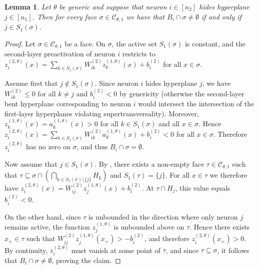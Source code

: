 \documentclass{article}
\newtheorem{lemma}[theorem]{Lemma}
\theoremstyle{definition}
\newcommand{\weights}[1]{W^{(#1)}}
\newcommand{\bias}[1]{b^{(#1)}}
\newcommand{\complex}{\mathcal{C}}
\newcommand{\activation}[1]{a^{(#1)}}
\newcommand{\preactivation}[1]{z^{(#1)}}
\begin{document}
\begin{lemma}
\label{lem:hidinghides}
Let $\theta$ be generic and suppose that neuron $i\in[n_2]$ hides hyperplane $j\in[n_1]$. 
Then for every face $\sigma\in\complex_{\theta,1}$ we have that
$
B_i\cap \sigma\neq\emptyset
$ if and only if $
j\in S_1(\sigma).
$
\end{lemma}

\begin{proof}
Let $\sigma\in\complex_{\theta,1}$ be a face. On $\sigma$, the active set $S_1(\sigma)$ is constant, and the second-layer preactivation of neuron $i$ restricts to
$
\preactivation{2,\theta}_i(x)
=
\sum_{k\in S_1(\sigma)} \weights{2}_{ik}\preactivation{1,\theta}_k(x)+\bias{2}_i
$
for all $x\in \sigma$.

Assume first that $j\notin S_1(\sigma)$. Since neuron $i$ hides hyperplane $j$, we have
$
\weights{2}_{ik} \leq 0
$
for all $k\neq j$ and
$
\bias{2}_i<0
$
by genericity (otherwise the second-layer bent hyperplane corresponding to neuron $i$ would intersect the intersection of the first-layer hyperplanes violating supertransversality). Moreover,
$
\preactivation{1,\theta}_k(x)=\activation{1,\theta}_k(x)> 0
$
for all $k\in S_1(\sigma)$ and all $x\in \sigma$. Hence
$
\preactivation{2,\theta}_i(x)
=
\sum_{k\in S_1(\sigma)} \weights{2}_{ik}\activation{1,\theta}_k(x)+\bias{2}_i
<0
$
for all $x\in \sigma$. 
Therefore 
$\preactivation{2,\theta}_i$ has no zero on $\sigma$, and thus
$B_i\cap \sigma=\emptyset$. 

Now assume that $j\in S_1(\sigma)$. By , there exists a non-empty face
$
\tau \in \complex_{\theta,1}
$
such that
$
\tau \subseteq \sigma\cap\left( \bigcap_{k\in S_1(\sigma)\setminus\{j\}} H_k\right) 
$
%
and
$S_1(\tau)=\{j\}$. 
For all $x\in\tau$ we therefore have
$
\preactivation{2,\theta}_i(x)
=
\weights{2}_{ij}\preactivation{1,\theta}_j(x)+\bias{2}_i
$.
At $\tau\cap H_j$, this value equals $\bias{2}_i<0$.

On the other hand, since $\tau$ is unbounded in the direction where only neuron $j$ remains active, the function $\preactivation{1,\theta}_j$ is unbounded above on $\tau$. Hence there exists $x_+\in\tau$ such that
$
\weights{2}_{ij}\preactivation{1,\theta}_j(x_+) > -\bias{2}_i$, 
and therefore
$
\preactivation{2,\theta}_i(x_+)>0$. 
By continuity, $\preactivation{2,\theta}_i$ must vanish at some point of $\tau$, and since $\tau\subseteq \sigma$, it follows that
$
B_i\cap \sigma\neq\emptyset
$, proving the claim. 
\end{proof}
\end{document}
